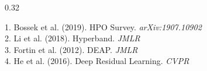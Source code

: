 \documentclass[final]{beamer}
\begin{document}
\begin{frame}[t]
\begin{columns}[T]
\begin{column}{0.32\textwidth}
\vspace{1mm}

\begin{tcolorbox}[posterbox, title=REFERENCES]
\tiny
1. Bossek et al. (2019). HPO Survey. \textit{arXiv:1907.10902}\\
2. Li et al. (2018). Hyperband. \textit{JMLR}\\
3. Fortin et al. (2012). DEAP. \textit{JMLR}\\
4. He et al. (2016). Deep Residual Learning. \textit{CVPR}
\end{tcolorbox}

\end{column}
\end{columns}

\end{frame}
\end{document}
